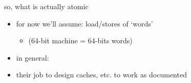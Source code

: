 
\begin{frame}{so, what is actually atomic}
    \begin{itemize}
    \item for now we'll assume: load/stores of `words' 
        \begin{itemize}
        \item  (64-bit machine = 64-bits words)
        \end{itemize}
        \vspace{.5cm}
    \item in general: 
    \item their job to design caches, etc. to work as documented
    \end{itemize}
\end{frame}
